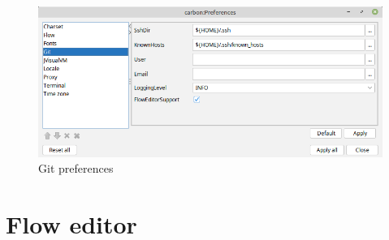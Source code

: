 \documentclass[a4paper]{book}
\begin{document}
\begin{figure}[htb]
  \centering
  \includegraphics[width=12.0cm]{images/preferences.png}
  \caption{Git preferences}
  \label{preferences}
\end{figure}


\section{Flow editor}



\end{document}
